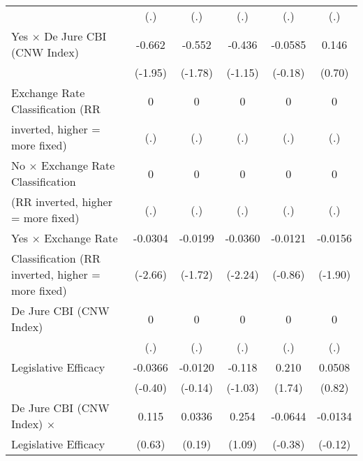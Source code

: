 {\begin{tabular}{l*{5}{c}}
                                        &      (.)         &      (.)         &      (.)         &      (.)         &      (.)         \\
\addlinespace
Yes $\times$ De Jure CBI (CNW Index)    &   -0.662         &   -0.552         &   -0.436         &  -0.0585         &    0.146         \\
                                        &  (-1.95)         &  (-1.78)         &  (-1.15)         &  (-0.18)         &   (0.70)         \\
\addlinespace
Exchange Rate Classification (RR        &        0         &        0         &        0         &        0         &        0         \\
inverted, higher = more fixed)          &      (.)         &      (.)         &      (.)         &      (.)         &      (.)         \\
\addlinespace
No $\times$ Exchange Rate Classification&        0         &        0         &        0         &        0         &        0         \\
(RR inverted, higher = more fixed)      &      (.)         &      (.)         &      (.)         &      (.)         &      (.)         \\
\addlinespace
Yes $\times$ Exchange Rate              &  -0.0304\sym{**} &  -0.0199         &  -0.0360\sym{*}  &  -0.0121         &  -0.0156         \\
Classification (RR inverted, higher = more fixed)&  (-2.66)         &  (-1.72)         &  (-2.24)         &  (-0.86)         &  (-1.90)         \\
\addlinespace
De Jure CBI (CNW Index)                 &        0         &        0         &        0         &        0         &        0         \\
                                        &      (.)         &      (.)         &      (.)         &      (.)         &      (.)         \\
\addlinespace
Legislative Efficacy                    &  -0.0366         &  -0.0120         &   -0.118         &    0.210         &   0.0508         \\
                                        &  (-0.40)         &  (-0.14)         &  (-1.03)         &   (1.74)         &   (0.82)         \\
\addlinespace
De Jure CBI (CNW Index) $\times$        &    0.115         &   0.0336         &    0.254         &  -0.0644         &  -0.0134         \\
Legislative Efficacy                    &   (0.63)         &   (0.19)         &   (1.09)         &  (-0.38)         &  (-0.12)         \\

\end{tabular}}
